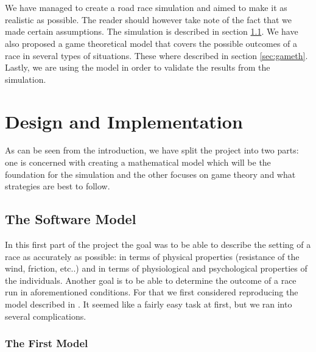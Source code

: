 \documentclass[10pt, a4paper]{report}
\begin{document}
\\\\
We have managed to create a road race simulation and aimed to make it as realistic as possible. The reader should however take note of the fact that we made certain assumptions. The simulation is described in section \ref{sec:softmodel}. We have also proposed a game theoretical model that  covers the possible outcomes of a race in several types of situations. These where described in section \ref{sec:gameth}. Lastly, we are using the model in order to validate the results from the simulation.

\chapter{Design and Implementation}\label{ch:design&impl}

As can be seen from the introduction, we have split the project into two parts: one is concerned with creating a mathematical model which will be the foundation  for the simulation and the other focuses on game theory and what strategies are best to follow.

\section{The Software Model}\label{sec:softmodel}

In this first part of the project the goal was to be able to describe the setting of a race as accurately as possible: in terms of physical properties (resistance of the wind, friction, etc..) and in terms of physiological and psychological properties of the individuals. Another goal is to be able to determine the outcome of a race run in aforementioned conditions. For that we first considered reproducing the model described in \cite{AgentModel}. It seemed like a fairly easy task at first, but we ran into several complications.

\subsection{The First Model}\label{subsec:model1}
\end{document}
